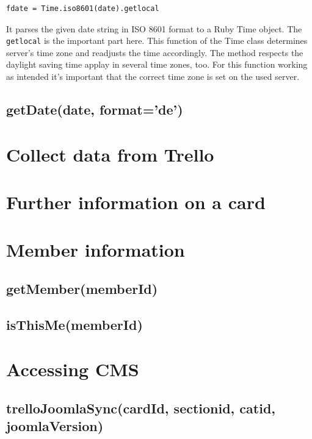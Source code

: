 \begin{lstlisting}[aboveskip=1\baselineskip, caption=Response of the token request., label=listing021]
fdate = Time.iso8601(date).getlocal
\end{lstlisting}

It parses the given date string in ISO 8601 format to a Ruby Time object. The \lstinline{getlocal} is the important part here. This function of the Time class determines server's time zone and readjusts the time accordingly. The method respects the daylight saving time applay in several time zones, too. For this function working as intended it's important that the correct time zone is set on the used server. 

\subsection{getDate(date, format='de')}


\section{Collect data from Trello}


\section{Further information on a card}


\section{Member information}

\subsection{getMember(memberId)}

\subsection{isThisMe(memberId)}

\section{Accessing CMS}

\subsection{trelloJoomlaSync(cardId, sectionid, catid, joomlaVersion)}




